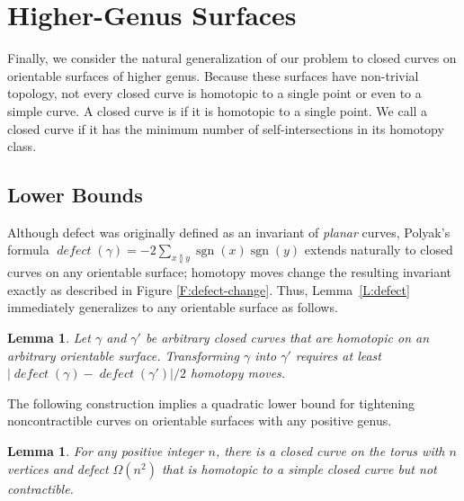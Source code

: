 \documentclass[11pt,twoside]{article}
\def\sgn{\operatorname{sgn}}
\def\abs#1{\mathopen| #1 \mathclose|}		%
\def\Defect{\operatorname{\mathit{defect}}}
\newtheorem{lemma}[theorem]{Lemma}
\numberwithin{figure}{section}
\begin{document}
\section{Higher-Genus Surfaces}
\label{S:genus}

Finally, we consider the natural generalization of our problem to closed curves on orientable surfaces of higher genus. Because these surfaces have non-trivial topology, not every closed curve is homotopic to a single point or even to a simple curve. A closed curve is  if it is homotopic to a single point. We call a closed curve  if it has the minimum number of self-intersections in its homotopy class.

\subsection{Lower Bounds}

Although defect was originally defined as an invariant of \emph{planar} curves, Polyak's formula $\Defect(\gamma) = -2\sum_{x\between y} \sgn(x)\sgn(y)$ extends naturally to closed curves on any orientable surface; homotopy moves change the resulting invariant exactly as described in Figure \ref{F:defect-change}. Thus, Lemma~\ref{L:defect} immediately generalizes to any orientable surface as follows.

\begin{lemma}
\label{L:defect-surface}
Let $\gamma$ and $\gamma'$ be arbitrary closed curves that are homotopic on an arbitrary orientable surface. Transforming $\gamma$ into $\gamma'$ requires at least $\abs{\Defect(\gamma) - \Defect(\gamma')}/2$ homotopy moves.
\end{lemma}

The following construction implies a quadratic lower bound for tightening noncontractible curves on orientable surfaces with any positive genus.

\begin{lemma}
For any positive integer $n$, there is a closed curve on the torus with $n$ vertices and defect $\Omega(n^2)$ that is homotopic to a simple closed curve but not contractible.
\end{lemma}
\end{document}
